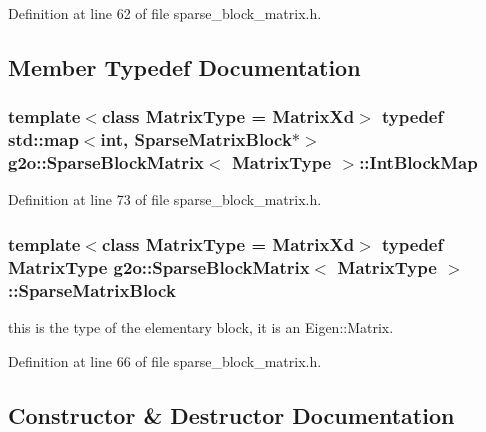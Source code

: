 Definition at line 62 of file sparse\+\_\+block\+\_\+matrix.\+h.



\subsection{Member Typedef Documentation}
\subsubsection[{\texorpdfstring{Int\+Block\+Map}{IntBlockMap}}]{\setlength{\rightskip}{0pt plus 5cm}template$<$class Matrix\+Type = Matrix\+Xd$>$ typedef std\+::map$<$int, {\bf Sparse\+Matrix\+Block}$\ast$$>$ {\bf g2o\+::\+Sparse\+Block\+Matrix}$<$ Matrix\+Type $>$\+::{\bf Int\+Block\+Map}}\hypertarget{classg2o_1_1SparseBlockMatrix_aaa6ca1ae454ed70f62992b6401645f4e}{}\label{classg2o_1_1SparseBlockMatrix_aaa6ca1ae454ed70f62992b6401645f4e}


Definition at line 73 of file sparse\+\_\+block\+\_\+matrix.\+h.

\subsubsection[{\texorpdfstring{Sparse\+Matrix\+Block}{SparseMatrixBlock}}]{\setlength{\rightskip}{0pt plus 5cm}template$<$class Matrix\+Type = Matrix\+Xd$>$ typedef Matrix\+Type {\bf g2o\+::\+Sparse\+Block\+Matrix}$<$ Matrix\+Type $>$\+::{\bf Sparse\+Matrix\+Block}}\hypertarget{classg2o_1_1SparseBlockMatrix_ab2f7376cbf055803fda6527dcc43e3be}{}\label{classg2o_1_1SparseBlockMatrix_ab2f7376cbf055803fda6527dcc43e3be}


this is the type of the elementary block, it is an Eigen\+::\+Matrix. 



Definition at line 66 of file sparse\+\_\+block\+\_\+matrix.\+h.



\subsection{Constructor \& Destructor Documentation}
